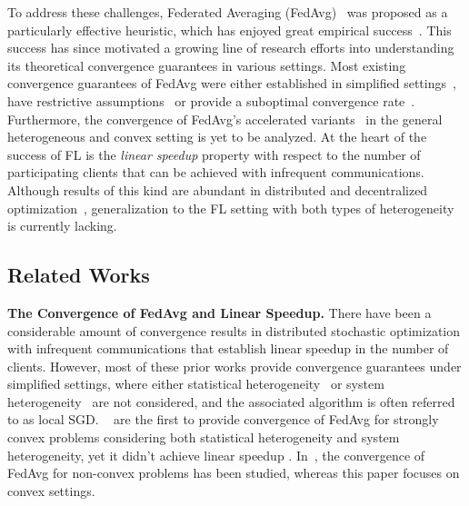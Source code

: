 To address these challenges, Federated Averaging (FedAvg)~\cite{mcmahan2016communication} was proposed as a particularly effective heuristic, which has enjoyed great empirical success~\cite{47586}. This success has since motivated a growing line of research efforts into understanding its theoretical convergence guarantees in various settings. Most existing convergence guarantees of FedAvg were either established in simplified settings~\cite{stich2018local,khaled2019first,wang2018cooperative,yu2019parallel,khaled2020tighter,li2018federated,koloskova2020unified}, have restrictive assumptions~\cite{haddadpour2019convergence} or provide a suboptimal 
convergence rate~\cite{li2019convergence}. Furthermore, the convergence of
FedAvg's accelerated variants~\cite{yu2019linear,huo2020faster,liu2019accelerating} in the general heterogeneous and convex setting is yet to be analyzed. At the heart of the success of FL is the \emph{linear speedup} property with respect to the number of participating clients that can be achieved with infrequent communications. Although results of this kind are abundant in distributed and decentralized optimization~\cite{yu2019linear,yu2019parallel,stich2018local,khaled2020tighter,koloskova2020unified}, generalization to the FL setting with both types of heterogeneity is currently lacking.

\subsection{Related Works}
\textbf{The Convergence of FedAvg and Linear Speedup.}
There have been a considerable amount of convergence results in distributed stochastic optimization with infrequent communications that establish linear speedup in the number of clients. However, most of these prior works provide
convergence guarantees under simplified settings, where either statistical
heterogeneity~\cite{stich2018local,zhou2017convergence,wang2018cooperative,woodworth2018graph,haddadpour2019convergence} or system
heterogeneity~\cite{yu2019parallel,wang2019adaptive,khaled2019first,jiang2018linear,koloskova2020unified} are not
considered, and the associated algorithm is often referred to as local SGD. ~\cite{li2019convergence} are the first to provide convergence of FedAvg for strongly convex problems considering both statistical heterogeneity and system heterogeneity, yet it
didn't achieve linear speedup \cite{yu2019parallel,haddadpour2019convergence,stich2018local}. In~\cite{haddadpour2019convergence,liang2019variance,huo2020faster,jiang2018linear}, the convergence of FedAvg for non-convex problems has been studied, whereas this paper focuses on convex settings.
\begin{comment}
However, \cite{huo2020faster} did not discuss the linear speedup and the theorems in \cite{haddadpour2019convergence,liang2019variance} failed to cover the accelerated version of
FedAvg. 
\end{comment}

